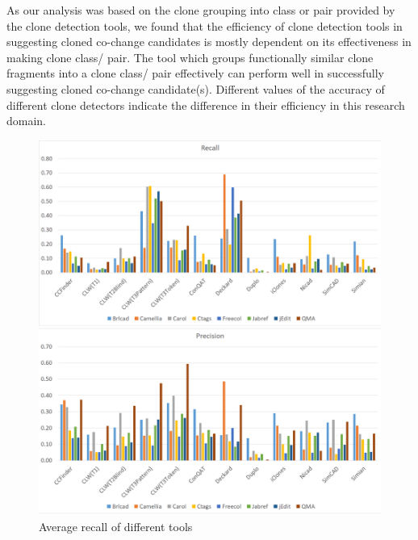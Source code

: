 \documentclass[review]{elsarticle}
\begin{document}
As our analysis was based on the clone grouping into class or pair provided by the clone detection tools, we found that the efficiency of clone detection tools in suggesting cloned co-change candidates is mostly dependent on its effectiveness in making clone class/ pair. The tool which groups functionally similar clone fragments into a clone class/ pair effectively can perform well in successfully suggesting cloned co-change candidate(s). Different values of the accuracy of different clone detectors indicate the difference in their efficiency in this research domain. 

\begin{figure}
\centering
\includegraphics[width=\textwidth] {AveragePrecisionRecall.png}
\caption{Average recall of different tools}
\label{fig:AveragePrecisionRecall}
\end{figure}

\end{document}

